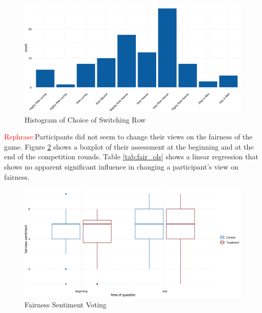 \begin{figure}
    \centering
    \includegraphics[width=\textwidth]{graphs/hist_mpl.png}
    \caption{Histogram of Choice of Switching Row}
    \label{fig:hist_mpl}
\end{figure}


\textcolor{red}{Rephrase:}Participants did not seem to change their views on the fairness of the game. Figure \ref{fig:fairness_boxplot} shows a boxplot of their assessment at the beginning and at the end of the competition rounds. Table \ref{tab:fair_ols} shows a linear regression that shows no apparent significant influence in changing a participant's view on fairness.\\

\begin{figure}
    \centering
    \includegraphics[width=\textwidth]{graphs/fairness_sentiment_boxplot.png}
    \caption{Fairness Sentiment Voting}
    \label{fig:fairness_boxplot}
\end{figure}



